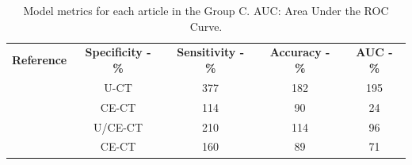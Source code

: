 \documentclass{article}
\begin{document}
\begin{table}[]
    \centering
    \begin{tabular}{ccccc}\toprule
        \multirow{2}{*}{\textbf{Reference}} & \multirow{2}{*}{\textbf{Specificity - \%}} & \multirow{2}{*}{\textbf{Sensitivity - \%}} & \multirow{2}{*}{\textbf{Accuracy - \%}} & \multirow{2}{*}{\textbf{AUC - \%}} \\
        \\\midrule
        \cite{Bi2017}                       & U-CT                                       & 377                                        & 182                                     & 195                                \\
        \cite{Bi2022}                       & CE-CT                                      & 114                                        & 90                                      & 24                                 \\
        \cite{Kong2022}                     & U/CE-CT                                    & 210                                        & 114                                     & 96                                 \\
        \cite{Zheng2020}                    & CE-CT                                      & 160                                        & 89                                      & 71                                 \\
        \bottomrule
    \end{tabular}
    \caption{Model metrics for each article in the Group C. AUC: Area Under the ROC Curve.}
    \label{tab:res_C}
\end{table}



\end{document}
